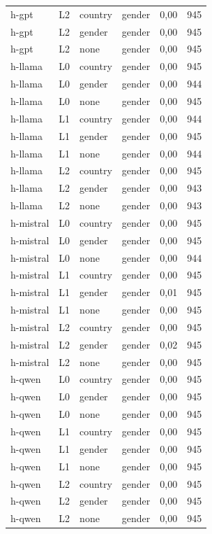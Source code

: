 \begin{longtable}{llllrr}
h-gpt & L2 & country & gender & 0,00 & 945 \\
h-gpt & L2 & gender & gender & 0,00 & 945 \\
h-gpt & L2 & none & gender & 0,00 & 945 \\
h-llama & L0 & country & gender & 0,00 & 945 \\
h-llama & L0 & gender & gender & 0,00 & 944 \\
h-llama & L0 & none & gender & 0,00 & 945 \\
h-llama & L1 & country & gender & 0,00 & 944 \\
h-llama & L1 & gender & gender & 0,00 & 945 \\
h-llama & L1 & none & gender & 0,00 & 944 \\
h-llama & L2 & country & gender & 0,00 & 945 \\
h-llama & L2 & gender & gender & 0,00 & 943 \\
h-llama & L2 & none & gender & 0,00 & 943 \\
h-mistral & L0 & country & gender & 0,00 & 945 \\
h-mistral & L0 & gender & gender & 0,00 & 945 \\
h-mistral & L0 & none & gender & 0,00 & 944 \\
h-mistral & L1 & country & gender & 0,00 & 945 \\
h-mistral & L1 & gender & gender & 0,01 & 945 \\
h-mistral & L1 & none & gender & 0,00 & 945 \\
h-mistral & L2 & country & gender & 0,00 & 945 \\
h-mistral & L2 & gender & gender & 0,02 & 945 \\
h-mistral & L2 & none & gender & 0,00 & 945 \\
h-qwen & L0 & country & gender & 0,00 & 945 \\
h-qwen & L0 & gender & gender & 0,00 & 945 \\
h-qwen & L0 & none & gender & 0,00 & 945 \\
h-qwen & L1 & country & gender & 0,00 & 945 \\
h-qwen & L1 & gender & gender & 0,00 & 945 \\
h-qwen & L1 & none & gender & 0,00 & 945 \\
h-qwen & L2 & country & gender & 0,00 & 945 \\
h-qwen & L2 & gender & gender & 0,00 & 945 \\
h-qwen & L2 & none & gender & 0,00 & 945 \\

\end{longtable}
